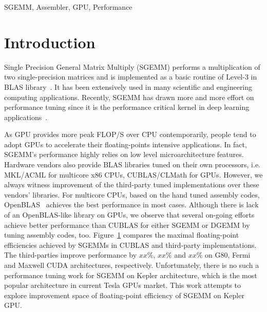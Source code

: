 \documentclass{sig-alternate-05-2015}
\begin{document}
\keywords
SGEMM, Assembler, GPU, Performance

\section{Introduction}
Single Precision General Matrix Multiply (SGEMM) performs a multiplication of two single-precision matrices and is implemented as a basic routine of Level-3 in BLAS library~\cite{}. It has been extensively used in many scientific and engineering computing applications. Recently, SGEMM has drawn more and more effort on performance tuning since it is the performance critical kernel in deep learning applications~\cite{}.

As GPU provides more peak FLOP/S over CPU contemporarily, people tend to adopt GPUs to accelerate their floating-points intensive applications. In fact, SGEMM's performance highly relies on low level microarchitecture features. Hardware vendors also provide BLAS libraries tuned on their own processors, i.e. MKL/ACML for multicore x86 CPUs, CUBLAS/CLMath for GPUs. However, we always witness improvement of the third-party tuned implementations over these vendors' libraries. For multicore CPUs, based on the hand tuned assembly codes, OpenBLAS~\cite{} achieves the best performance in most cases. Although there is lack of an OpenBLAS-like library on GPUs, we observe that several on-going efforts~\cite{} achieve better performance than CUBLAS for either SGEMM or DGEMM by tuning assembly codes, too. Figure~\ref{} compares the maximal floating-point efficiencies achieved by SGEMMs in CUBLAS and third-party implementations. The third-parties improve performance by $xx\%$, $xx\%$ and $xx\%$ on G80, Fermi and Maxwell CUDA architectures, respectively. Unfortunately, there is no such a performance tuning work for SGEMM on Kepler architecture, which is the most popular architecture in current Tesla GPUs market. This work attempts to explore improvement space of floating-point efficiency of SGEMM on Kepler GPU.
\end{document}

